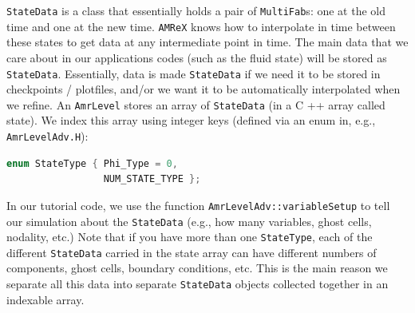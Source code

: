 {\tt StateData} is a class that essentially holds a pair of {\tt MultiFab}s: one at the old time and one
at the new time. {\tt AMReX} knows how to interpolate in time between these states to get data at
any intermediate point in time. The main data that we care about in our applications codes 
(such as the fluid state) will be stored as {\tt StateData}. Essentially, data is made {\tt StateData}
if we need it to be stored in checkpoints / plotfiles, and/or we want it to be automatically
interpolated when we refine.
An {\tt AmrLevel} stores an array of {\tt StateData} (in a C ++ array called state). We index this array
using integer keys (defined via an enum in, e.g., {\tt AmrLevelAdv.H}):
\begin{lstlisting}[language=cpp]
enum StateType { Phi_Type = 0,
                 NUM_STATE_TYPE };
\end{lstlisting}
In our tutorial code, we use the function {\tt AmrLevelAdv::variableSetup} to tell our simulation about
the {\tt StateData} (e.g., how many variables, ghost cells, nodality, etc.)
Note that if you have more than one {\tt StateType}, each of the different {\tt StateData} 
carried in the state array can have different numbers
of components, ghost cells, boundary conditions, etc. This is the main reason we separate all this
data into separate {\tt StateData} objects collected together in an indexable array.

